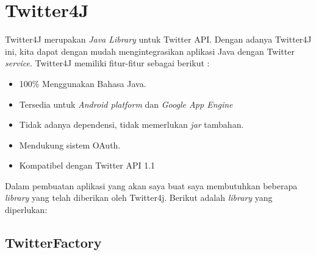 \section{Twitter4J}
Twitter4J merupakan \textit{Java Library} untuk Twitter API. Dengan adanya Twitter4J ini, kita dapat dengan mudah mengintegrasikan aplikasi Java dengan Twitter \textit{service}. Twitter4J memiliki fitur-fitur sebagai berikut :

\begin{itemize}
	\item 100\% Menggunakan Bahasa Java.
	\item Tersedia untuk \textit{Android platform} dan \textit{Google App Engine}
	\item Tidak adanya dependensi, tidak memerlukan \textit{jar} tambahan.
	\item Mendukung sistem OAuth.
	\item Kompatibel dengan Twitter API 1.1
\end{itemize}

Dalam pembuatan aplikasi yang akan saya buat saya membutuhkan beberapa \textit{library} yang telah diberikan oleh Twitter4j. Berikut adalah \textit{library} yang diperlukan:
\subsection{TwitterFactory}
	
